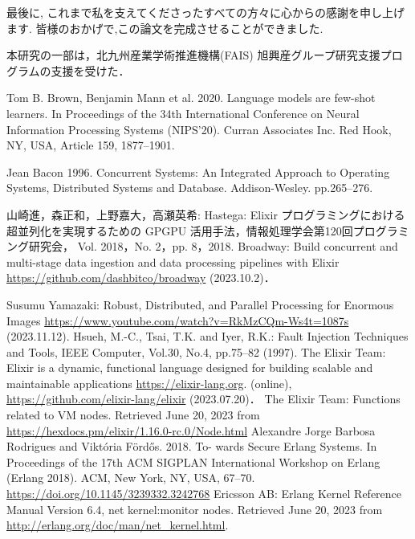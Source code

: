 \documentclass[a4paper]{jreport}	%
\begin{document}
最後に, これまで私を支えてくださったすべての方々に心からの感謝を申し上げます. 皆様のおかげで,この論文を完成させることができました. 

本研究の一部は，北九州産業学術推進機構(FAIS) 旭興産グループ研究支援プログラムの支援を受けた．



\newpage
{}
\renewcommand{\bibname}{参考文献}

%
%

\begin{thebibliography}{99}

Tom B. Brown, Benjamin Mann et al. 2020. Language models are few-shot learners. In Proceedings of the 34th International Conference on Neural Information Processing Systems (NIPS'20). Curran Associates Inc. Red Hook, NY, USA, Article 159, 1877--1901.

Jean Bacon 1996. Concurrent Systems: An Integrated Approach to Operating Systems, Distributed Systems and Database. Addison-Wesley. pp.265--276.

山崎進，森正和，上野嘉大，高瀬英希: Hastega: Elixir プログラミングにおける超並列化を実現するための GPGPU 活用手法，情報処理学会第120回プログラミング研究会， Vol. 2018，No. 2，pp. 8，2018.
Broadway: Build concurrent and multi-stage data ingestion and data processing pipelines with Elixir \url{https://github.com/dashbitco/broadway} (2023.10.2)．

Susumu Yamazaki: Robust, Distributed, and Parallel Processing for Enormous Images \url{https://www.youtube.com/watch?v=RkMzCQm-Ws4t=1087s} (2023.11.12).
Hsueh, M.-C., Tsai, T.K. and Iyer, R.K.: Fault Injection Techniques and Tools, IEEE Computer, Vol.30, No.4, pp.75--82 (1997).
The Elixir Team: Elixir is a dynamic, functional language designed for building scalable and maintainable applications \url{https://elixir-lang.org}. (online), \url{https://github.com/elixir-lang/elixir} (2023.07.20)．
The Elixir Team: Functions related to VM nodes. Retrieved June 20, 2023 from \url{https://hexdocs.pm/elixir/1.16.0-rc.0/Node.html}
Alexandre Jorge Barbosa Rodrigues and Viktória Fördős. 2018. To- wards Secure Erlang Systems. In Proceedings of the 17th ACM SIGPLAN International Workshop on Erlang (Erlang 2018). ACM, New York, NY, USA, 67--70. \url{https://doi.org/10.1145/3239332.3242768}
Ericsson AB: Erlang Kernel Reference Manual Version 6.4, net kernel:monitor nodes. Retrieved June 20, 2023 from \url{http://erlang.org/doc/man/net_kernel.html}.


\end{thebibliography}
\end{document}
